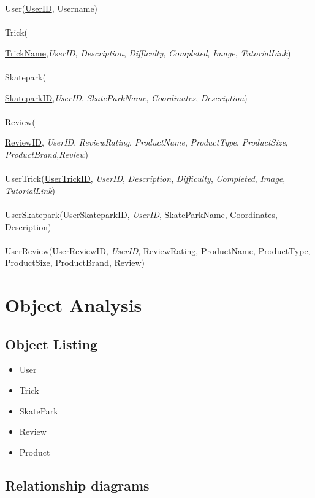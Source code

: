 User({\underline{UserID}, Username}) \\ \\
Trick({\underline{TrickName},\emph{UserID},\emph{ Description}, \emph{Difficulty}, \emph{Completed},\emph{ Image}, \emph{TutorialLink}) \\ \\
Skatepark({\underline{SkateparkID},\emph{UserID}, \emph{ SkateParkName}, \emph{Coordinates}, \emph{Description}) \\ \\
Review({\underline{ReviewID}, \emph{UserID}, \emph{ReviewRating},\emph{ ProductName},\emph{ ProductType},\emph{ ProductSize}, \emph{ ProductBrand},\emph{Review}) \\ \\

UserTrick(\underline{UserTrickID}, \emph{UserID}, \emph{ Description},\emph{ Difficulty}, \emph{Completed},\emph{ Image}, \emph{TutorialLink}) \\ \\

UserSkatepark(\underline{UserSkateparkID}, \emph{UserID},   SkateParkName, Coordinates, Description) \\ \\

UserReview(\underline{UserReviewID}, \emph{UserID},  ReviewRating, ProductName, ProductType, ProductSize,  ProductBrand, Review) \\



\section{Object Analysis}

\subsection{Object Listing}

\begin{itemize}
\item User
\item Trick
\item SkatePark
\item Review
\item Product 

\end{itemize}

\subsection{Relationship diagrams}

}}}
